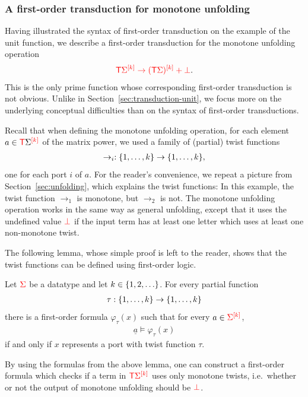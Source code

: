 \subsubsection{A first-order transduction for monotone unfolding}
\label{sec:fo-transduction-for-unfolding}
Having illustrated the syntax of first-order transduction on the example of the unit function, we describe a first-order transduction for the monotone unfolding operation 
\begin{align*}
    \ranked{\tmonad \mati k{\Sigma} \to \mati k{( \tmonad \Sigma)} + \termset}.
\end{align*}
This is the only prime function whose corresponding first-order transduction is not obvious.
Unlike in Section~\ref{sec:transduction-unit},  we focus more  on the underlying conceptual difficulties than on the syntax of first-order transductions. 

Recall  that when  defining the  monotone  unfolding operation,  for each element $a \in {\tmonad \mati k{\Sigma}}$ of the matrix power, we used a family of (partial) twist functions
\begin{align*}
\to_i : \set{1,\ldots,k} \to \set{1,\ldots,k},
\end{align*}
one for each port $i$ of $a$. For the reader's convenience, we repeat a picture from Section~\ref{sec:unfolding}, which explains the twist functions:
In this example, the twist function $\to_1$ is monotone, but  $\to_2$ is not. The monotone unfolding operation works in the same way as general  unfolding, except that it uses the undefined value $\termset$ if the input term has at least one letter which uses at least one non-monotone twist. 

The following lemma, whose simple proof is left to the reader, shows that the twist functions can be defined using first-order logic.
\begin{lemma}
    Let $\rSigma$ be a datatype and let $k \in \set{1,2,\ldots}$. For every partial function
    \begin{align*}
    \tau : \set{1,\ldots,k} \to \set{1,\ldots,k}
    \end{align*}
    there is a first-order formula $\varphi_\tau(x)$ such that for every $a \in \mati k \rSigma$, 
    \begin{align*}
    \underline a \models \varphi_\tau(x)
    \end{align*}
     if and only if $x$ represents a port  with twist function $\tau$.  
\end{lemma}
By using the formulas from the above lemma, one can construct  a first-order formula which checks if a term in $\tmonad \mati k \rSigma$ uses only monotone twists, i.e.~whether or not the output of monotone unfolding should be $\termset$. 

